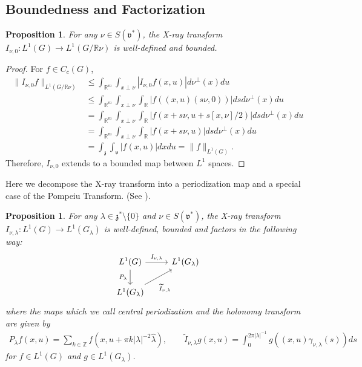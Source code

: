 \documentclass[11pt]{amsart}
\theoremstyle{plain}
\newtheorem{proposition}[theorem]{Proposition}
\theoremstyle{definition}
\theoremstyle{remark}
\numberwithin{equation}{section}
\def\fz{\mathfrak{z}}
\def\fv{\mathfrak{v}}
\def\R{{\mathbb R}}%
\numberwithin{equation}{section}
\begin{document}
\subsection{Boundedness and Factorization}
\begin{proposition}
	For any $\nu\in S(\fv^*)$, the X-ray transform $I_{\nu, 0}: L^1(G)\to L^1(G/\R\nu)$ is well-defined and bounded. 
\end{proposition}
\begin{proof}
	For $f\in C_c(G)$, 
	\begin{align*}
		\|I_{\nu, 0}f\|_{L^1(G/\R\nu)}
		&\leq\int_{\R^m} \int_{x\perp \nu}|I_{\nu, 0}f(x, u)|d\nu^\perp(x) du\\
		&\leq\int_{\R^m} \int_{x\perp \nu}\int_\R |f((x, u)(s\nu, 0))|dsd\nu^\perp(x)du\\
		&=\int_{\R^m}\int_{x\perp \nu} \int_\R| f(x+s\nu, u+s [x, \nu]/2)|dsd\nu^\perp(x)du\\
		&=\int_{\R^m}\int_{x\perp \nu} \int_\R| f(x+s\nu, u)|dsd\nu^\perp(x)du\\
		&=\int_{\fz}\int_{\fv}|f(x, u)|dxdu=\|f\|_{L^1(G)}.
	\end{align*}
Therefore, $I_{\nu, 0}$ extends to a bounded map between $L^1$ spaces.
\end{proof}
Here we decompose the X-ray transform into a periodization map and a special case of the Pompeiu Transform. (See \cite{agranovskyInjectivityPompeiuTransform1994}).
\begin{proposition}\label{factorization}
	For any $\lambda\in \mathfrak{z}^*\setminus \{0\}$ and $\nu\in S(\fv^*)$, the X-ray transform $I_{\nu, \lambda}: L^1(G)\to L^1(G_\lambda)$ is well-defined, bounded and factors in the following way:
	\[ 
	\begin{tikzcd}
		L^1(G) \arrow[d, "P_{\lambda}" left=1]  \arrow[r, "{I}_{\nu, \lambda}"]  &L^1(G_\lambda)\\
		L^1(G_{\lambda}) \arrow[ur, "\widetilde{I}_{\nu, \lambda}" below=10, pos=0.75]
	\end{tikzcd}
	\]
	where the maps which we call \textit{central periodization} and the \textit{holonomy transform} are given by 
	\begin{align*}
		P_{\lambda}f(x, u)=\sum_{k\in\mathbb{Z}}f(x, u+\pi k |\lambda|^{-2}\hat{\lambda}), 
		\quad \quad
		\widetilde{I}_{\nu, \lambda}g(x, u)=\int_0^{2\pi |\lambda|^{-1}}g\left( (x, u)\gamma_{\nu, \lambda}(s)\right)ds
	\end{align*}
	for $f\in L^1(G)$ and $g\in L^1(G_\lambda)$.
\end{proposition}
\end{document}

